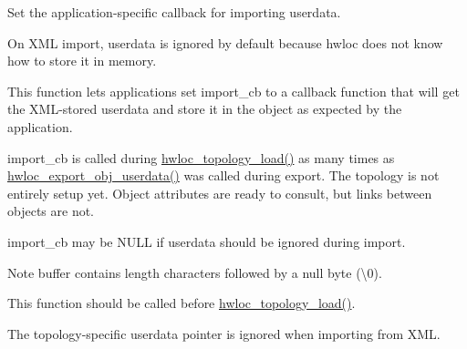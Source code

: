 Set the application-\/specific callback for importing userdata. 

On X\+ML import, userdata is ignored by default because hwloc does not know how to store it in memory.

This function lets applications set {\ttfamily import\+\_\+cb} to a callback function that will get the X\+M\+L-\/stored userdata and store it in the object as expected by the application.

{\ttfamily import\+\_\+cb} is called during \hyperlink{a00186_gabdf58d87ad77f6615fccdfe0535ff826}{hwloc\+\_\+topology\+\_\+load()} as many times as \hyperlink{a00206_gaa541bdd628416dbbe97d0df69d3de958}{hwloc\+\_\+export\+\_\+obj\+\_\+userdata()} was called during export. The topology is not entirely setup yet. Object attributes are ready to consult, but links between objects are not.

{\ttfamily import\+\_\+cb} may be {\ttfamily N\+U\+LL} if userdata should be ignored during import.

\begin{DoxyNote}{Note}
{\ttfamily buffer} contains {\ttfamily length} characters followed by a null byte (\textquotesingle{}\textbackslash{}0\textquotesingle{}).

This function should be called before \hyperlink{a00186_gabdf58d87ad77f6615fccdfe0535ff826}{hwloc\+\_\+topology\+\_\+load()}.

The topology-\/specific userdata pointer is ignored when importing from X\+ML. 
\end{DoxyNote}
